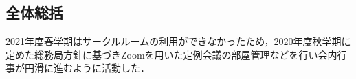 \subsection*{全体総括}

2021年度春学期はサークルルームの利用ができなかったため，2020年度秋学期に定めた総務局方針に基づきZoomを用いた定例会議の部屋管理などを行い会内行事が円滑に進むように活動した．
